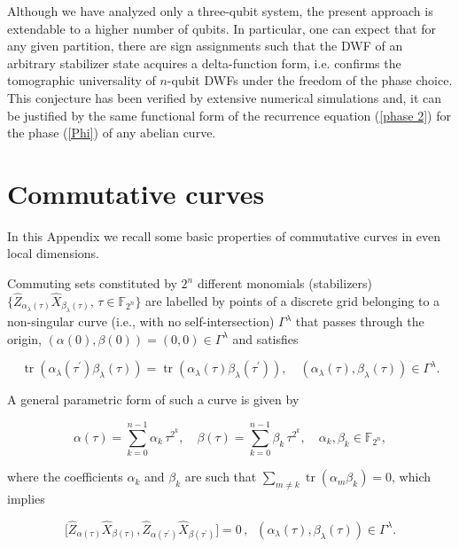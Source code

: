 \documentclass{article}
\DeclareMathOperator{\tr}{tr}
\begin{document}
Although we have analyzed only a three-qubit system, the present approach is
extendable to a higher number of qubits. In particular, one can expect that
for any given partition, there are sign assignments such that the DWF of an
arbitrary stabilizer state acquires a delta-function form, i.e. confirms the
tomographic universality of $n$-qubit DWFs under the freedom of the phase
choice. This conjecture has been verified by extensive numerical simulations
and, it can be justified by the same functional form of the recurrence
equation (\ref{phase 2}) for the phase (\ref{Phi}) of any abelian curve.

\appendix

\section{Commutative curves}

In this Appendix we recall some basic properties of commutative curves in
even local dimensions.

Commuting sets constituted by $2^{n}$ different monomials (stabilizers) $\{
\hat{Z}_{\alpha _{\lambda }(\tau )}\hat{X}_{\beta _{\lambda }(\tau )}, \, \tau
\in \mathbb{F}_{2^{n}}\}$ are labelled by points of a discrete grid belonging to
a non-singular curve (i.e., with no self-intersection) $\Gamma^{\lambda }$ that
passes through the origin, $(\alpha (0),\beta (0))=(0,0)\in \Gamma^{\lambda }$
and satisfies

\begin{equation*}
  \tr\left(
    \alpha_{\lambda}(\tau^{\prime})\beta_{\lambda}(\tau)
  \right)
  = \tr\left(
    \alpha_{\lambda}(\tau)\beta_{\lambda}(\tau^{\prime })
  \right),
  \quad \left(
    \alpha_{\lambda }(\tau), \beta_{\lambda}(\tau)
  \right) \in \Gamma^{\lambda}. 
\end{equation*}

A general parametric form of such a curve is given by

\begin{equation}
  \alpha (\tau)
  = \sum_{k=0}^{n-1}\alpha_{k}\,\tau^{2^{k}},
  \quad
  \beta(\tau)
  = \sum_{k=0}^{n-1}\beta_{k} \, \tau^{2^{k}},
  \quad \alpha_{k},\beta_{k}\in \mathbb{F}_{2^{n}},
  \label{curve1a}
\end{equation}

where the coefficients $\alpha_k$ and $\beta_k$ are such that $\sum_{m \neq k}
\tr(\alpha_{m}\beta_{k})=0$, which implies

\begin{equation}
  \lbrack
  \hat{Z}_{\alpha (\tau )}\hat{X}_{\beta (\tau )},
  \hat{Z}_{\alpha (\tau^{\prime })}\hat{X}_{\beta(\tau^{\prime})}
  ] = 0 \, , \;\; \left(
    \alpha_{\lambda}(\tau),\beta_{\lambda}(\tau)
  \right) \in \Gamma ^{\lambda }.
  \label{stab}
\end{equation}
\end{document}
